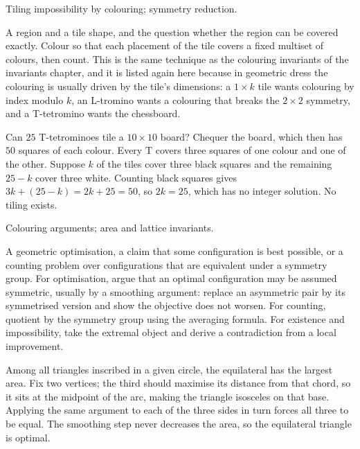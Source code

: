 \begin{seealsob}Tiling impossibility by colouring; symmetry reduction.\end{seealsob}

\cue A region and a tile shape, and the question whether the region can be covered exactly.
\method Colour so that each placement of the tile covers a fixed multiset of colours, then count. This is the same technique as the colouring invariants of the invariants chapter, and it is listed again here because in geometric dress the colouring is usually driven by the tile's dimensions: a $1\times k$ tile wants colouring by index modulo $k$, an L-tromino wants a colouring that breaks the $2\times2$ symmetry, and a T-tetromino wants the chessboard.

\begin{worked}
Can $25$ T-tetrominoes tile a $10\times10$ board? Chequer the board, which then has $50$ squares of each colour. Every T covers three squares of one colour and one of the other. Suppose $k$ of the tiles cover three black squares and the remaining $25-k$ cover three white. Counting black squares gives $3k+(25-k)=2k+25=50$, so $2k=25$, which has no integer solution. No tiling exists.
\end{worked}

\begin{seealsob}Colouring arguments; area and lattice invariants.\end{seealsob}

\cue A geometric optimisation, a claim that some configuration is best possible, or a counting problem over configurations that are equivalent under a symmetry group.
\method For optimisation, argue that an optimal configuration may be assumed symmetric, usually by a smoothing argument: replace an asymmetric pair by its symmetrised version and show the objective does not worsen. For counting, quotient by the symmetry group using the averaging formula. For existence and impossibility, take the extremal object and derive a contradiction from a local improvement.

\begin{worked}
Among all triangles inscribed in a given circle, the equilateral has the largest area. Fix two vertices; the third should maximise its distance from that chord, so it sits at the midpoint of the arc, making the triangle isosceles on that base. Applying the same argument to each of the three sides in turn forces all three to be equal. The smoothing step never decreases the area, so the equilateral triangle is optimal.
\end{worked}

